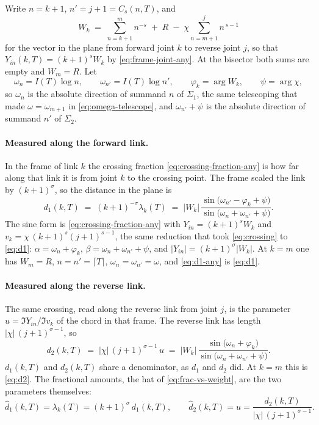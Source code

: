 \documentclass[11pt]{article}
\theoremstyle{definition}
\begin{document}
Write $n=k+1$, $n'=j+1=C_{s}(n,T)$, and
\begin{equation}\label{eq:W-any}
W_k
\;=\;
\sum_{n=k+1}^{m}n^{-s}
\;+\;R
\;-\;\chi\sum_{n=m+1}^{j}n^{\,s-1}
\end{equation}
for the vector in the plane from forward joint $k$ to reverse joint $j$, so
that $Y_{in}(k,T)=(k+1)^{s}W_k$ by \eqref{eq:frame-joint-any}. At the
bisector both sums are empty and $W_m=R$. Let
\begin{equation}\label{eq:omega-any}
\omega_n=I(T)\log n,
\qquad
\omega_{n'}=I(T)\log n',
\qquad
\varphi_k=\arg W_k,
\qquad
\psi=\arg\chi,
\end{equation}
so $\omega_n$ is the absolute direction of summand $n$ of $\Sigma_1$, the
same telescoping that made $\omega=\omega_{m+1}$ in \eqref{eq:omega-telescope},
and $\omega_{n'}+\psi$ is the absolute direction of summand $n'$ of
$\Sigma_2$.

\paragraph{Measured along the forward link.} In the frame of link $k$ the crossing fraction
\eqref{eq:crossing-fraction-any} is how far along that link it is from joint
$k$ to the crossing point. The frame scaled the link by $(k+1)^{\sigma}$, so the distance
in the plane is
\begin{equation}\label{eq:d1-any}
d_1(k,T)
\;=\;
(k+1)^{-\sigma}\lambda_k(T)
\;=\;
|W_k|\,
\frac{\sin\!\bigl(\omega_{n'}-\varphi_k+\psi\bigr)}
     {\sin\!\bigl(\omega_n+\omega_{n'}+\psi\bigr)}.
\end{equation}
The sine form is \eqref{eq:crossing-fraction-any} with
$Y_{in}=(k+1)^{s}W_k$ and $v_k=\chi\,(k+1)^{s}(j+1)^{s-1}$, the same
reduction that took \eqref{eq:crossing} to \eqref{eq:d1}:
$\alpha=\omega_n+\varphi_k$, $\beta=\omega_n+\omega_{n'}+\psi$, and
$|Y_{in}|=(k+1)^{\sigma}|W_k|$. At $k=m$ one has $W_m=R$,
$n=n'=\lceil T\rceil$, $\omega_n=\omega_{n'}=\omega$, and
\eqref{eq:d1-any} is \eqref{eq:d1}.

\paragraph{Measured along the reverse link.} The same crossing, read along the reverse
link from joint $j$, is the parameter
$u=\Im Y_{in}/\Im v_k$ of the chord in that frame. The reverse link has
length $|\chi|\,(j+1)^{\sigma-1}$, so
\begin{equation}\label{eq:d2-any}
d_2(k,T)
\;=\;
|\chi|\,(j+1)^{\sigma-1}\,u
\;=\;
|W_k|\,
\frac{\sin\!\bigl(\omega_n+\varphi_k\bigr)}
     {\sin\!\bigl(\omega_n+\omega_{n'}+\psi\bigr)}.
\end{equation}
$d_1(k,T)$ and $d_2(k,T)$ share a denominator, as $d_1$ and $d_2$ did. At $k=m$ this
is \eqref{eq:d2}. The fractional amounts, the hat of
\eqref{eq:frac-vs-weight}, are the two parameters themselves:
\begin{equation}\label{eq:hat-any}
\hat d_1(k,T)=\lambda_k(T)=(k+1)^{\sigma}\,d_1(k,T),
\qquad
\hat d_2(k,T)=u=\frac{d_2(k,T)}{|\chi|\,(j+1)^{\sigma-1}}.
\end{equation}
\end{document}
